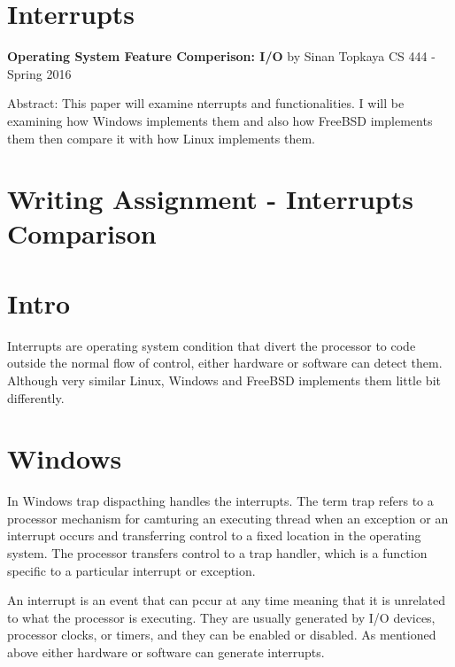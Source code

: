 \documentclass[letterpaper,10pt,draftclsnofoot,onecolumn]{IEEEtran}
\begin{document}
\newpage
\section{Interrupts}\label{AppendixC}

\begin{titlepage}
		
		\begin{center}
		\bigbreak	
		\textbf{Operating System Feature Comperison: I/O}
		\bigbreak
		by Sinan Topkaya
		\smallbreak
		CS 444 - Spring 2016
		\end{center}
		\vfill
		
		Abstract: This paper will examine nterrupts and functionalities. I will be examining how Windows implements them and also how FreeBSD implements them then compare it with how Linux implements them. 
		
	\end{titlepage}

\section*{Writing Assignment - Interrupts Comparison}
\section*{Intro}

Interrupts are operating system condition that divert the processor to code outside the normal flow of control, either hardware or software can detect them. Although very similar Linux, Windows and FreeBSD implements them little bit differently. 

\section*{Windows}

In Windows trap dispacthing handles the interrupts. The term trap refers to a processor mechanism for camturing an executing thread when an exception or an interrupt occurs and transferring control to a fixed location in the operating system. The processor transfers control to a trap handler, which is a function specific to a particular interrupt or exception.\cite{[1]}

An interrupt is an event that can pccur at any time meaning that it is unrelated to what the processor is executing. They are usually generated by I/O devices, processor clocks, or timers, and they can be enabled or disabled. As mentioned above either hardware or software can generate interrupts.
\end{document}
